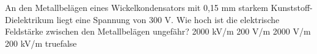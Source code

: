     {An den Metallbelägen eines Wickelkondensators mit 0,15 mm starkem Kunststoff-Dielektrikum liegt eine Spannung von 300 V. Wie hoch ist die elektrische Feldstärke zwischen den Metallbelägen ungefähr?}
    {2000 kV/m}
    {200 V/m}
    {2000 V/m}
    {200 kV/m}
    {true}{false}
